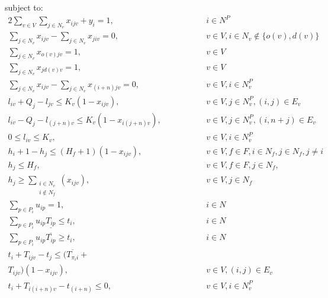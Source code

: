 \documentclass[a4paper,10pt]{article}
\begin{document}
subject to:
\begingroup
    \allowdisplaybreaks
\begin{alignat} {2}
    \sum_{v\in V}\sum_{j\in N_v}x_{ijv} + y_i = 1,	        	&\quad\quad\quad&& 	 i \in N^P 				\label{eq:2} 	\\[4pt]
    \sum_{j\in N_v}x_{ijv} - \sum_{j\in N_v}x_{jiv} = 0,		& 	&&	v \in V, i\in N_v \notin \{o(v), d(v)\}		\label{eq:3} 	\\[4pt]
    \sum_{j\in N_v}x_{o(v)jv} = 1,				        & 	&&	v \in V 					\label{eq:4}	\\[4pt]
    \sum_{j\in N_v}x_{j d(v)v} = 1,					& 	&&	v \in V 					\label{eq:5}	\\[4pt]
    \sum_{j\in N_v}x_{ijv} - \sum_{j\in N_v}x_{(i+n)jv} = 0,  	        & 	&&	v \in V, i\in N^P_v 				\label{eq:6}	\\[4pt]
    l_{iv} + Q_j - l_{jv} \leq K_v(1-x_{ijv}),			        & 	&&	v \in V, j\in N_v^P, (i,j) \in E_v 		\label{eq:7} 	\\[8pt]
    l_{iv} - Q_j - l_{(j+n)v} \leq K_v(1-x_{i(j+n)v}),	        	& 	&&	v \in V ,j\in N_v^P, (i, n+j)\in E_v 		\label{eq:8}	\\[8pt]
    0 \leq l_{iv} \leq K_v,						& 	&&	v \in V, i \in N^P_v 				\label{eq:9}	\\[8pt]
    h_{i} + 1 - h_{j} \leq (H_f+1)(1-x_{ijv}),				& 	&&	v \in V, f\in F,  i \in N_f, j \in N_f, j\neq i	\label{eq:10}	\\[4pt]
    h_{j} \leq H_f,                                                     & 	&&	v \in V,f\in F, j\in N_f,  			\label{eq:11}	\\[4pt]
    h_{j} \geq \sum_{\substack{i\in N_v\\i{\notin} N_f}}(x_{ijv}),	        & 	&&	v \in V, j \in N_f                      	\label{eq:12}	\\[4pt]
    \sum_{p\in P_i} u_{ip} = 1,						& 	&& 	i \in N 					\label{eq:13}	\\[4pt]
    \sum_{p\in P_i} u_{ip}\underline{T_{ip}} \leq t_{i},		& 	&&	i \in N 					\label{eq:14}	\\[4pt]
    \sum_{p\in P_i} u_{ip}\overline{T_{ip}} \geq t_{i},			& 	&& 	i \in N 					\label{eq:15}	\\[4pt]
    t_{i} + T_{ijv} - t_{j} \leq (\overline{T_{\pi_i i}} + 		& 	&&						\nonumber\\
    T_{ijv})(1 - x_{ijv}),						& 	&& 	v \in V, (i,j) \in E_v				\label{eq:16}	\\[8pt]
    t_{i} + T_{i(i+n)v} - t_{(i+n)} \leq 0,				& 	&& 	v \in V, i \in N_v^P				\label{eq:17}	\\[8pt]

\end{alignat}
\end{document}
